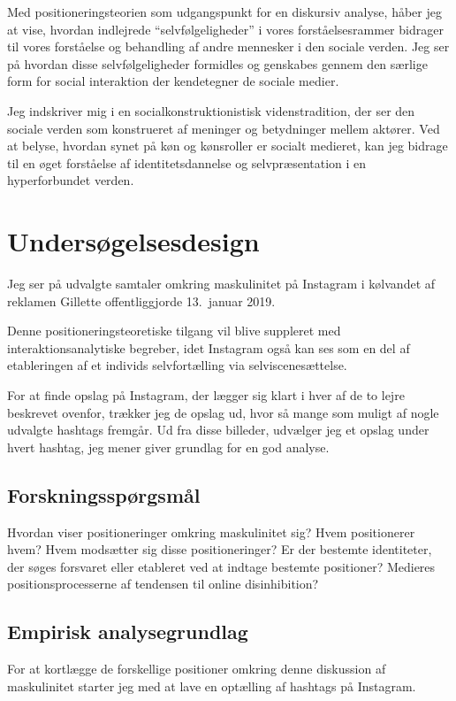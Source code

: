 Med positioneringsteorien som udgangspunkt for en diskursiv 
analyse, håber jeg at vise, hvordan indlejrede “selvfølgeligheder” 
i vores forståelsesrammer bidrager til vores forståelse og 
behandling af andre mennesker i den sociale verden. Jeg ser på 
hvordan disse selvfølgeligheder formidles og genskabes gennem den 
særlige form for social interaktion der kendetegner de sociale 
medier.

Jeg indskriver mig i en socialkonstruktionistisk videnstradition, 
der ser den sociale verden som konstrueret af meninger og 
betydninger mellem aktører. Ved at belyse, hvordan synet på køn og 
kønsroller er socialt medieret, kan jeg bidrage til en øget 
forståelse af identitetsdannelse og selvpræsentation i en 
hyperforbundet verden.

\section{Undersøgelsesdesign}

Jeg ser på udvalgte samtaler omkring maskulinitet på Instagram i
kølvandet af reklamen Gillette offentliggjorde 13.\ januar 2019.  

Denne positioneringsteoretiske tilgang vil blive suppleret med
interaktionsanalytiske begreber, idet Instagram også kan ses som 
en del af etableringen af et individs selvfortælling via 
selviscenesættelse. 

For at finde opslag på Instagram, der lægger sig klart i hver af 
de to lejre beskrevet ovenfor, trækker jeg de opslag ud, hvor så 
mange som muligt af nogle udvalgte hashtags fremgår. Ud fra disse 
billeder, udvælger jeg et opslag under hvert hashtag, jeg mener 
giver grundlag for en god analyse.

\subsection{Forskningsspørgsmål}

Hvordan viser positioneringer
omkring maskulinitet sig? Hvem positionerer hvem? Hvem modsætter
sig disse positioneringer? Er der bestemte identiteter, der søges
forsvaret eller etableret ved at indtage bestemte positioner?
Medieres positionsprocesserne af tendensen til online
disinhibition?

\subsection{Empirisk analysegrundlag}
%
For at kortlægge de forskellige positioner omkring denne 
diskussion af maskulinitet starter jeg med at lave en optælling af 
hashtags på Instagram.

